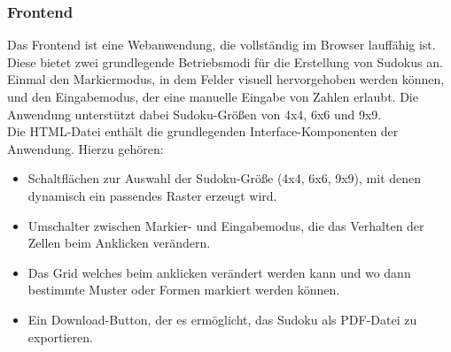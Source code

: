 \subsubsection{Frontend}
Das Frontend ist eine Webanwendung, die vollständig im Browser lauffähig ist.
Diese bietet zwei grundlegende Betriebsmodi für die Erstellung von Sudokus an.
Einmal den Markiermodus, in dem Felder visuell hervorgehoben werden können,
und den Eingabemodus, der eine manuelle Eingabe von Zahlen erlaubt.
Die Anwendung unterstützt dabei Sudoku-Größen von 4x4, 6x6 und 9x9.
\\
Die HTML-Datei enthält die grundlegenden Interface-Komponenten der Anwendung. Hierzu gehören:
\begin{itemize}
    \item Schaltflächen zur Auswahl der Sudoku-Größe (4x4, 6x6, 9x9), mit denen dynamisch ein passendes Raster erzeugt wird.
    \item Umschalter zwischen Markier- und Eingabemodus, die das Verhalten der Zellen beim Anklicken verändern.
    \item Das Grid welches beim anklicken verändert werden kann und wo dann bestimmte Muster oder Formen markiert werden können.
    \item Ein Download-Button, der es ermöglicht, das Sudoku als PDF-Datei zu exportieren.
\end{itemize}

